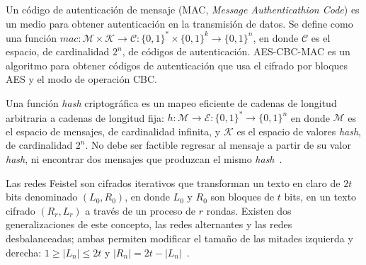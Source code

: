 Un código de autenticación de mensaje (MAC, \textit{Message Authenticathion
Code}) es un medio para obtener autenticación en la transmisión de datos. Se
define como una función $ mac: \mathcal{M} \times \mathcal{K} \rightarrow
\mathcal{C} : \{ 0, 1 \}^* \times \{ 0, 1 \}^k \rightarrow \{ 0, 1 \}^n $, en
donde $ \mathcal{C} $ es el espacio, de cardinalidad $ 2^n $, de códigos de
autenticación. AES-CBC-MAC es un algoritmo para obtener códigos de autenticación
que usa el cifrado por bloques AES y el modo de operación CBC.

Una función \textit{hash} criptográfica es un mapeo eficiente de cadenas de
longitud arbitraria a cadenas de longitud fija: $ h: \mathcal{M} \rightarrow
\mathcal{E} : \{ 0, 1 \}^* \rightarrow \{ 0, 1 \}^n $ en donde $ \mathcal{M} $
es el espacio de mensajes, de cardinalidad infinita, y $ \mathcal{K} $ es el
espacio de valores \textit{hash}, de cardinalidad $ 2^n $. No debe ser factible
regresar al mensaje a partir de su valor \textit{hash}, ni encontrar dos
mensajes que produzcan el mismo \textit{hash}~\cite{menezes}.


Las redes Feistel son cifrados iterativos que transforman un texto en claro de $
2t $ bits denominado $ (L_0, R_0) $, en donde $ L_0 $ y $ R_0 $ son bloques de $
t $ bits, en un texto cifrado $ (R_r, L_r) $ a través de un proceso de $ r $
rondas. Existen dos generalizaciones de este concepto, las redes alternantes y
las redes desbalanceadas; ambas permiten modificar el tamaño de las mitades
izquierda y derecha: $ 1 \geq | L_n | \leq 2t $ y $ | R_n | = 2t - | L_n |
$~\cite{DBLP:conf/fse/SchneierK96, DBLP:conf/fse/AndersonB96a}.


